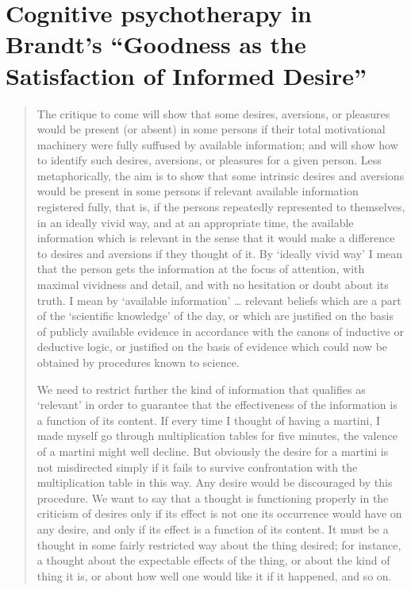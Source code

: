 \documentclass[letterpaper,11pt,twoside]{article}
\begin{document}
\section{Cognitive psychotherapy in Brandt's ``Goodness as the Satisfaction of Informed Desire''} \label{sec:cognitive_psychotherapy}
  \begin{quotation}
    The critique to come will show that some desires, aversions, or pleasures would be present (or absent) in some persons if their total motivational machinery were fully suffused by available information; and will show how to identify such desires, aversions, or pleasures for a given person. Less metaphorically, the aim is to show that some intrinsic desires and aversions would be present in some persons if relevant available information registered fully, that is, if the persons repeatedly represented to themselves, in an ideally vivid way, and at an appropriate time, the available information which is relevant in the sense that it would make a difference to desires and aversions if they thought of it.  By `ideally vivid way' I mean that the person gets the information at the focus of attention, with maximal vividness and detail, and with no hesitation or doubt about its truth. I mean by `available information' \ldots{} relevant beliefs which are a part of the `scientific knowledge' of the day, or which are justified on the basis of publicly available evidence in accordance with the canons of inductive or deductive logic, or justified on the basis of evidence which could now be obtained by procedures known to science.

    We need to restrict further the kind of information that qualifies as `relevant' in order to guarantee that the effectiveness of the information is a function of its content. If every time I thought of having a martini, I made myself go through multiplication tables for five minutes, the valence of a martini might well decline. But obviously the desire for a martini is not misdirected simply if it fails to survive confrontation with the multiplication table in this way. Any desire would be discouraged by this procedure. We want to say that a thought is functioning properly in the criticism of desires only if its effect is not one its occurrence would have on any desire, and only if its effect is a function of its content. It must be a thought in some fairly restricted way about the thing desired; for instance, a thought about the expectable effects of the thing, or about the kind of thing it is, or about how well one would like it if it happened, and so on.


\end{quotation}
\end{document}
